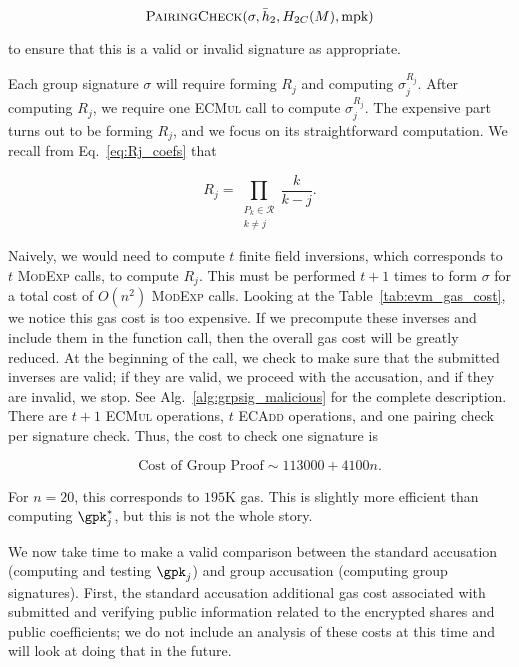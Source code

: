 \begin{equation}
    \textsc{PairingCheck}(\sigma, \bar{h}_{2}, H_{2C}(M), \text{mpk})
\end{equation}

\noindent
to ensure that this is a valid or invalid signature as appropriate.

Each group signature $\sigma$ will require forming $R_{j}$
and computing $\sigma_{j}^{R_{j}}$.
After computing $R_{j}$, we require one \textsc{ECMul} call
to compute $\sigma_{j}^{R_{j}}$.
The expensive part turns out to be forming $R_{j}$,
and we focus on its straightforward computation.
We recall from Eq.~\eqref{eq:Rj_coefs} that

\begin{equation}
    R_{j} = \prod_{\substack{P_{k}\in\mathcal{R} \\ k\ne j}} \frac{k}{k-j}.
\end{equation}

\noindent
Naively, we would need to compute $t$ finite field inversions,
which corresponds to $t$ \textsc{ModExp} calls, to compute
$R_{j}$.
This must be performed $t+1$ times to form $\sigma$
for a total cost of $O(n^{2})$ \textsc{ModExp} calls.
Looking at the Table~\ref{tab:evm_gas_cost}, we notice this gas cost
is too expensive.
If we precompute these inverses and include them
in the function call, then the overall gas cost will be greatly reduced.
At the beginning of the call, we check to make sure that the submitted
inverses are valid; if they are valid, we proceed with the
accusation, and if they are invalid, we stop.
See Alg.~\ref{alg:grpsig_malicious} for the complete description.
There are $t+1$ \textsc{ECMul} operations, $t$ \textsc{ECAdd} operations,
and one pairing check per signature check.
Thus, the cost to check one signature is

\begin{equation}
    \text{Cost of Group Proof} \sim 113000 + 4100n.
    \label{eq:cost_group}
\end{equation}

\noindent
For $n=20$, this corresponds to $195$K gas.
This is slightly more efficient than computing $\gpk_{j}^{*}$,
but this is not the whole story.

We now take time to make a valid comparison between the
standard accusation (computing and testing $\gpk_{j}$) and group accusation
(computing group signatures).
First, the standard accusation additional gas cost associated
with submitted and verifying public information related to the
encrypted shares and public coefficients;
we do not include an analysis of these costs at this time
and will look at doing that in the future.

